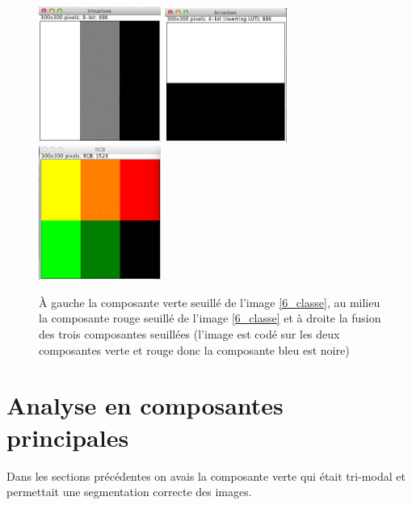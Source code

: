 \documentclass[a4paper,10pt]{article}
\begin{document}
\begin{figure}
\begin{center}
	\includegraphics[width=4cm]{images/6_classe_trinaire}
	\includegraphics[width=4cm]{images/6_classe_binaire}
	\includegraphics[width=4cm]{images/6_classe_fusion}
\end{center}
	\caption{\`A gauche la composante verte seuill\'e de l'image \ref{6_classe}, au milieu la composante rouge seuill\'e de l'image \ref{6_classe} et \`a droite la fusion des trois composantes seuill\'ees (l'image est cod\'e sur les deux composantes verte et rouge donc la composante bleu est noire)}
	\label{6_classe_fusion}
\end{figure}

\newpage

\section{Analyse  en composantes principales}

Dans les sections pr\'ec\'edentes on avais la composante verte qui \'etait tri-modal et permettait une segmentation correcte des images.
\end{document}
